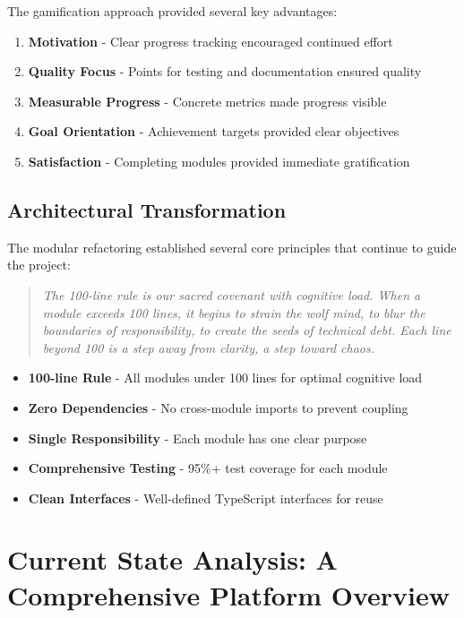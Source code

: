 \documentclass[11pt]{article}
\begin{document}
The gamification approach provided several key advantages:

\begin{enumerate}
\item \textbf{Motivation} - Clear progress tracking encouraged continued effort
\item \textbf{Quality Focus} - Points for testing and documentation ensured quality
\item \textbf{Measurable Progress} - Concrete metrics made progress visible
\item \textbf{Goal Orientation} - Achievement targets provided clear objectives
\item \textbf{Satisfaction} - Completing modules provided immediate gratification
\end{enumerate}

\subsection{Architectural Transformation}

The modular refactoring established several core principles that continue to guide the project:

\begin{quote}
\emph{The 100-line rule is our sacred covenant with cognitive load. When a module exceeds 100 lines, it begins to strain the wolf mind, to blur the boundaries of responsibility, to create the seeds of technical debt. Each line beyond 100 is a step away from clarity, a step toward chaos.}
\end{quote}

\begin{itemize}
\item \textbf{100-line Rule} - All modules under 100 lines for optimal cognitive load
\item \textbf{Zero Dependencies} - No cross-module imports to prevent coupling
\item \textbf{Single Responsibility} - Each module has one clear purpose
\item \textbf{Comprehensive Testing} - 95\%+ test coverage for each module
\item \textbf{Clean Interfaces} - Well-defined TypeScript interfaces for reuse
\end{itemize}

\section{Current State Analysis: A Comprehensive Platform Overview}
\end{document}
